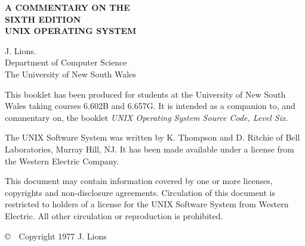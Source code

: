 %
%
\begin{center}
{\Huge \bf A COMMENTARY ON THE\\
\medskip
SIXTH EDITION \\
\bigskip
\smallskip
UNIX OPERATING SYSTEM }
\end{center}

\vspace{5cm}

\begin{center}
{\LARGE J. Lions. \\
Department of Computer Science \\
\medskip
The University of New South Wales}
\end{center}

\vspace{8cm}

\noindent This booklet has been produced for students at the
University of New South Wales taking courses 6.602B and 6.657G.
It is intended as a companion to, and commentary on,
the booklet {\sl UNIX Operating System Source Code, Level Six}.

\medskip
\noindent The UNIX Software System was written by K. Thompson and
D. Ritchie of Bell Laboratories, Murray Hill, NJ. It has been made
available under a license from the Western Electric Company.

\medskip
\noindent This document may contain information covered by one or more
licenses, copyrights and non-disclosure agreements. Circulation of
this document is restricted to holders of a license for the UNIX
Software System from Western Electric. All other circulation or
reproduction is prohibited.

\medskip
\begin{center}
\copyright~~Copyright 1977 J. Lions
\end{center}
